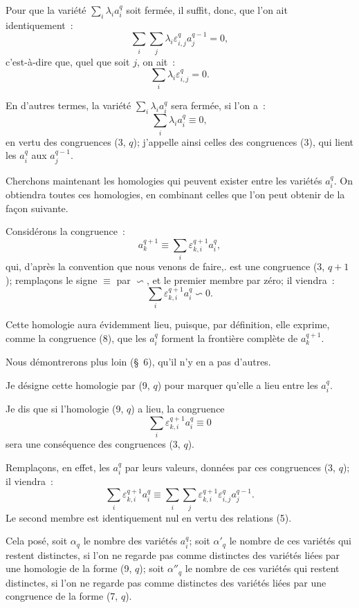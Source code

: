 \documentclass{article}
\begin{document}
Pour que la variété $\displaystyle\sum_{i} \lambda_{i} a^{q}_{i}$ soit fermée, il suffit, donc, que l'on ait identiquement~:
\[ \sum_{i} \sum_{j} \lambda_{i} \varepsilon^{q}_{i,j} a^{q-1}_{j} = 0, \]
c'est-à-dire que, quel que soit $j$, on ait~:
\[ \sum_{i} \lambda_{i} \varepsilon^{q}_{i,j} = 0. \]

En d'autres termes, la variété $\displaystyle\sum_{i} \lambda_{i} a^{q}_{i}$ sera fermée, si l'on a~:
\[ \sum_{i} \lambda_{i} a^{q}_{i} \equiv 0, \tag{7, $q$} \]
en vertu des congruences (3, $q$); j'appelle ainsi celles des congruences (3), qui lient les $a^{q}_{i}$ aux $a^{q-1}_{j}$.

Cherchons maintenant les homologies qui peuvent exister entre les variétés $a^{q}_{i}$. On obtiendra toutes ces homologies, en combinant celles que l'on peut obtenir de la façon suivante.

Considérons la congruence~:
\[ a^{q+1}_{k} \equiv \sum_{i} \varepsilon^{q+1}_{k,i} a^{q}_{i}, \tag{8} \]
qui, d'après la convention que nous venons de faire,. est une congruence (3, $q + 1$); remplaçons le signe $\equiv$ par $\backsim$, et le premier membre par zéro; il viendra~:
\[ \sum_{i} \varepsilon^{q+1}_{k,i} a^{q}_{i} \backsim 0. \tag{9, $q$} \]

Cette homologie aura évidemment lieu, puisque, par définition, elle exprime, comme la congruence (8), que les $a^{q}_{i}$ forment la frontière complète de $a^{q+1}_{k}$.


Nous démontrerons plus loin (\S~6), qu'il n'y en a pas d'autres.

Je désigne cette homologie par (9, $q$) pour marquer qu'elle a lieu entre les $a^{q}_{i}$.

Je dis que si l'homologie (9, $q$) a lieu, la congruence
\[ \sum_{i} \varepsilon^{q+1}_{k,i} a^{q}_{i} \equiv 0 \tag{10, $q$} \]
sera une conséquence des congruences (3, $q$).

Remplaçons, en effet, les $a^{q}_{i}$ par leurs valeurs, données par ces congruences (3, $q$); il viendra~:
\[ \sum_{i} \varepsilon^{q+1}_{k,i} a^{q}_{i} \equiv \sum_{i} \sum_{j} \varepsilon^{q+1}_{k,i} \varepsilon^{q}_{i,j} a^{q-1}_{j}. \]
Le second membre est identiquement nul en vertu des relations (5).

Cela posé, soit $\alpha_{q}$ le nombre des variétés $a^{q}_{i}$; soit $\alpha'_{q}$ le nombre de ces variétés qui restent distinctes, si l'on ne regarde pas comme distinctes des variétés liées par une homologie de la forme (9, $q$); soit $\alpha''_{q}$ le nombre de ces variétés qui restent distinctes, si l'on ne regarde pas comme distinctes des variétés liées par une congruence de la forme (7, $q$).
\end{document}
